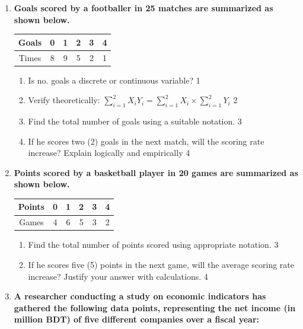 \documentclass[a4paper,oneside]{book}
\begin{document}
\begin{enumerate}
\item
	  \textbf{Goals scored by a footballer in 25 matches are summarized as shown below.} 
	  
	  \begin{table}[h]
	  \centering
\begin{tabular}{|c|ccccc|}
Goals & 0 & 1 & 2 & 3 & 4 \\ \hline
Times & 8 & 9 & 5 & 2 & 1
\end{tabular}
\end{table}
  
  \begin{enumerate}
    \item
	Is no. goals a discrete or continuous variable? \hfill 1
    \item
	Verify theoretically: $\displaystyle \sum_{i=1}^{2} X_iY_i = \sum_{i=1}^{2} X_i \times \sum_{i=1}^{2} Y_i$ \hfill 2
    \item  
	Find the total number of goals using a suitable notation. \hfill 3
    \item
	If he scores two (2) goals in the next match, will the scoring rate increase? Explain logically and empirically \hfill 4
  \end{enumerate}
  
  \item
\textbf{Points scored by a basketball player in 20 games are summarized as shown below.}

\begin{table}[h]
\centering
\begin{tabular}{|c|ccccc|}
Points & 0 & 1 & 2 & 3 & 4 \\ \hline
Games  & 4 & 6 & 5 & 3 & 2
\end{tabular}
\end{table}

\begin{enumerate}
    \item  
    Find the total number of points scored using appropriate notation. \hfill 3
    \item
    If he scores five (5) points in the next game, will the average scoring rate increase? Justify your answer with calculations. \hfill 4
\end{enumerate}

  
    \item  
	  \textbf{A researcher conducting a study on economic indicators has gathered the following data points, representing the net income (in million BDT) of five different companies over a fiscal year:}  
	  

\end{enumerate}
\end{document}
